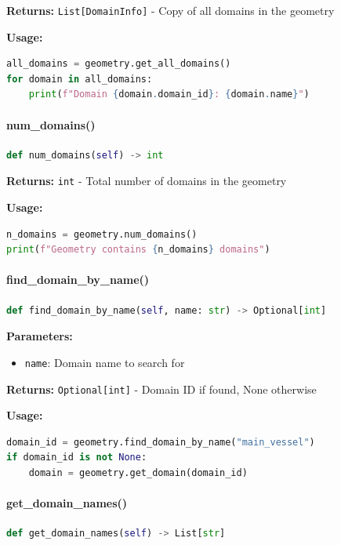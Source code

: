 \textbf{Returns:} \texttt{List[DomainInfo]} - Copy of all domains in the geometry

\textbf{Usage:}
\begin{lstlisting}[language=Python]
all_domains = geometry.get_all_domains()
for domain in all_domains:
    print(f"Domain {domain.domain_id}: {domain.name}")
\end{lstlisting}

\paragraph{num\_domains()}\leavevmode
\begin{lstlisting}[language=Python, caption=Number of Domains Method]
def num_domains(self) -> int
\end{lstlisting}

\textbf{Returns:} \texttt{int} - Total number of domains in the geometry

\textbf{Usage:}
\begin{lstlisting}[language=Python]
n_domains = geometry.num_domains()
print(f"Geometry contains {n_domains} domains")
\end{lstlisting}

\paragraph{find\_domain\_by\_name()}\leavevmode
\begin{lstlisting}[language=Python, caption=Find Domain by Name Method]
def find_domain_by_name(self, name: str) -> Optional[int]
\end{lstlisting}

\textbf{Parameters:}
\begin{itemize}
    \item \texttt{name}: Domain name to search for
\end{itemize}

\textbf{Returns:} \texttt{Optional[int]} - Domain ID if found, None otherwise

\textbf{Usage:}
\begin{lstlisting}[language=Python]
domain_id = geometry.find_domain_by_name("main_vessel")
if domain_id is not None:
    domain = geometry.get_domain(domain_id)
\end{lstlisting}

\paragraph{get\_domain\_names()}\leavevmode
\begin{lstlisting}[language=Python, caption=Get Domain Names Method]
def get_domain_names(self) -> List[str]
\end{lstlisting}

